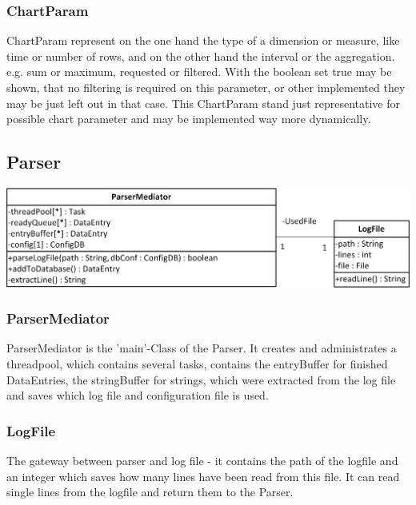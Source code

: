 \subsubsection*{ChartParam}  
ChartParam represent on the one hand the type of a dimension or measure, like time or number of rows, and
on the other hand the interval or the aggregation. e.g. sum or maximum, requested or filtered. 
With the boolean set true may be shown, that no filtering is required on this parameter, or other implemented
they may be just left out in that case. 
This ChartParam stand just representative for possible chart parameter and may be implemented way more dynamically.



\newpage
\subsection{Parser}

\begin{center}
\includegraphics{Pictures/Parts/ParsMedi.png}
\end{center}  

\subsubsection*{ParserMediator}
ParserMediator is the 'main'-Class of the Parser. It creates and administrates a threadpool,
 which contains several tasks, 
contains the entryBuffer for finished DataEntries, the stringBuffer for strings,
which were extracted from the log file and saves which log file and configuration file is used.

\subsubsection*{LogFile}
The gateway between parser and log file - it contains the path of the logfile and an integer 
which saves how many lines have been read from this file. It can read single lines from the
logfile and return them to the Parser.

